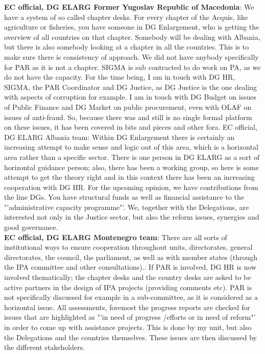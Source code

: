 \textbf{EC official, DG ELARG Former Yugoslav Republic of Macedonia}: We have a system of so called chapter desks. For every chapter of the Acquis, like agriculture or fisheries, you have someone in DG Enlargement, who is getting the overview of all countries on that chapter. Somebody will be dealing with Albania, but there is also somebody looking at a chapter in all the countries. This is to make sure there is consistency of approach. We did not have anybody specifically for PAR as it is not a chapter. SIGMA is sub contracted to do work on PA, as we do not have the capacity. For the time being, I am in touch with DG HR, SIGMA, the PAR Coordinator and DG Justice, as DG Justice is the one dealing with aspects of corruption for example. I am in touch with DG Budget on issues of Public Finance and DG Market on public procurement, even with OLAF on issues of anti-fraud. So, because there was and still is no single formal platform on these issues, it has been covered in bits and pieces and other fora. 
EC official, DG ELARG Albania team: Within DG Enlargement there is certainly an increasing attempt to make sense and logic out of this area, which is a horizontal area rather than a specific sector. There is one person in DG ELARG as a sort of horizontal guidance person; also, there has been a working group, so here is some attempt to get the theory right and in this context there has been an increasing cooperation with DG HR. For the upcoming opinion, we have contributions from the line DGs. You have structural funds as well as financial assistance to the "'administrative capacity programme"'. We, together with the Delegations, are interested not only in the Justice sector, but also the reform issues, synergies and good governance.\\
\textbf{EC official, DG ELARG Montenegro team}: There are all sorts of institutional ways to ensure cooperation throughout units, directorates, general directorates, the council, the parliament, as well as with member states (through the IPA committee and other consultations).. If PAR is involved, DG HR is now involved thematically; the chapter desks and the country desks are asked to be active partners in the design of IPA projects (providing comments etc). PAR is not specifically discussed for example in a sub-committee, as it is considered as a horizontal issue.  All assessments, foremost the progress reports are checked for issues that are highlighted as "'in need of progress /efforts or in need of reform"' in order to come up with assistance projects. This is done by my unit, but also the Delegations and the countries themselves. These issues are then discussed by the different stakeholders.\\
